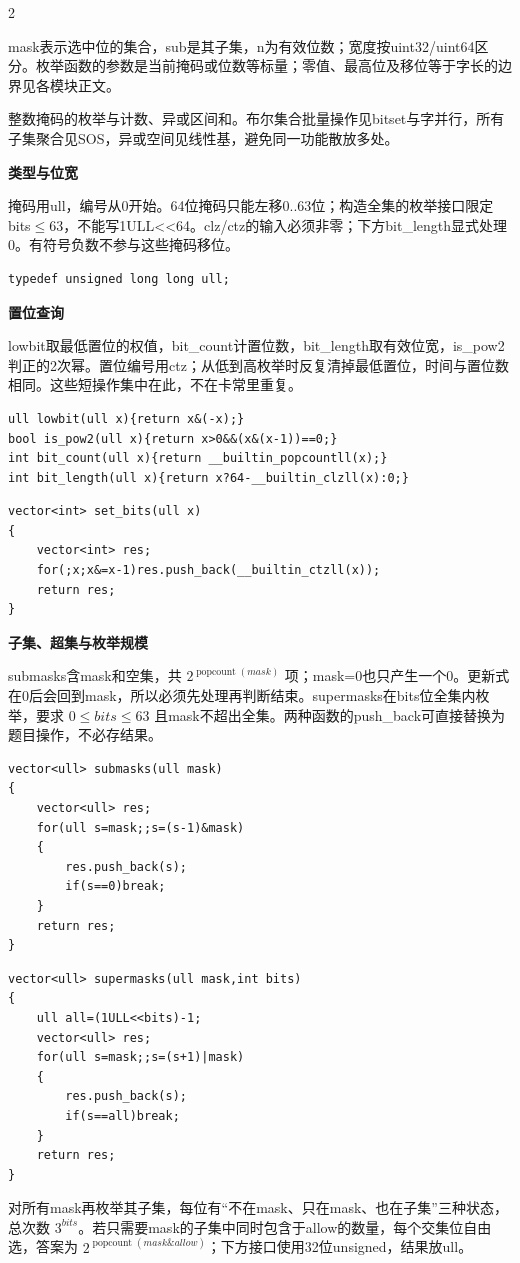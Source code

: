 \documentclass[UTF8,fontset=fandol,a4paper,twoside]{ctexart}
\newcommand{\topic}[1]{\par\smallskip\textbf{#1}\par\nobreak}
\newcommand{\note}[1]{{\fontsize{10}{12}\selectfont #1\par}}
\begin{document}
\begin{multicols}{2}
\note{mask表示选中位的集合，sub是其子集，n为有效位数；宽度按uint32/\allowbreak{}uint64区分。枚举函数的参数是当前掩码或位数等标量；零值、最高位及移位等于字长的边界见各模块正文。}
\note{整数掩码的枚举与计数、异或区间和。布尔集合批量操作见bitset与字并行，所有子集聚合见SOS，异或空间见线性基，避免同一功能散放多处。}
\topic{类型与位宽}
\note{掩码用ull，编号从0开始。64位掩码只能左移0.\allowbreak{}.\allowbreak{}63位；构造全集的枚举接口限定bits\ensuremath{\le}63，不能写1ULL<\allowbreak{}<\allowbreak{}64。clz/\allowbreak{}ctz的输入必须非零；下方bit\_length显式处理0。有符号负数不参与这些掩码移位。}
\begin{lstlisting}
typedef unsigned long long ull;
\end{lstlisting}
\topic{置位查询}
\note{lowbit取最低置位的权值，bit\_count计置位数，bit\_length取有效位宽，is\_pow2判正的2次幂。置位编号用ctz；从低到高枚举时反复清掉最低置位，时间与置位数相同。这些短操作集中在此，不在卡常里重复。}
\begin{lstlisting}
ull lowbit(ull x){return x&(-x);}
bool is_pow2(ull x){return x>0&&(x&(x-1))==0;}
int bit_count(ull x){return __builtin_popcountll(x);}
int bit_length(ull x){return x?64-__builtin_clzll(x):0;}
\end{lstlisting}
\begin{lstlisting}
vector<int> set_bits(ull x)
{
    vector<int> res;
    for(;x;x&=x-1)res.push_back(__builtin_ctzll(x));
    return res;
}
\end{lstlisting}
\topic{子集、超集与枚举规模}
\note{submasks含mask和空集，共 $2^{\operatorname{popcount}(mask)}$ 项；mask=\allowbreak{}0也只产生一个0。更新式在0后会回到mask，所以必须先处理再判断结束。supermasks在bits位全集内枚举，要求 $0\le bits\le63$ 且mask不超出全集。两种函数的push\_back可直接替换为题目操作，不必存结果。}
\begin{lstlisting}
vector<ull> submasks(ull mask)
{
    vector<ull> res;
    for(ull s=mask;;s=(s-1)&mask)
    {
        res.push_back(s);
        if(s==0)break;
    }
    return res;
}
\end{lstlisting}
\begin{lstlisting}
vector<ull> supermasks(ull mask,int bits)
{
    ull all=(1ULL<<bits)-1;
    vector<ull> res;
    for(ull s=mask;;s=(s+1)|mask)
    {
        res.push_back(s);
        if(s==all)break;
    }
    return res;
}
\end{lstlisting}
\note{对所有mask再枚举其子集，每位有“不在mask、只在mask、也在子集”三种状态，总次数 $3^{bits}$。若只需要mask的子集中同时包含于allow的数量，每个交集位自由选，答案为 $2^{\operatorname{popcount}(mask\&allow)}$；下方接口使用32位unsigned，结果放ull。}

\end{multicols}
\end{document}
